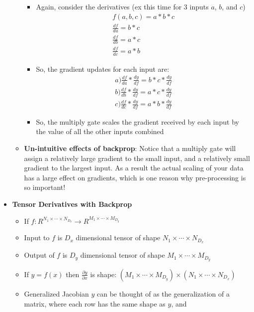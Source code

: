 \documentclass[12pt]{article}
\begin{document}
\begin{itemize}
\begin{itemize}
\begin{itemize}
        \item Again, consider the derivatives (ex this time for 3 inputs $a$, $b$, and $c$)
        \begin{gather*}
          f(a,b,c) = a*b*c \\
          \frac{df}{da} = b*c \\
          \frac{df}{db} = a*c \\
          \frac{df}{dc} = a*b
        \end{gather*}
        \item So, the gradient updates for each input are:
        \begin{gather*}
          a) \frac{df}{da} * \frac{dy}{df} = b*c * \frac{dy}{df} \\
          b) \frac{df}{db} * \frac{dy}{df} = a*c * \frac{dy}{df} \\
          c) \frac{df}{dc} * \frac{dy}{df} = a*b * \frac{dy}{df}
        \end{gather*}
        \item So, the multiply gate scales the gradient received by each input by the value
        of all the other inputs combined
      \end{itemize}
      \item \textbf{Un-intuitive effects of backprop}: Notice that a multiply gate will assign a relatively large gradient to the
      small input, and a relatively small gradient to the largest input. As a result the actual scaling of your data has a large effect
      on gradients, which is one reason why pre-processing is so important!
    \end{itemize}
    \item \textbf{Tensor Derivatives with Backprop}
    \begin{itemize}
      \item If $f: R^{N_1 \times \dotsi \times N_{D_x}} \rightarrow R^{M_1 \times \dotsi \times M_{D_y}}$
      \item Input to $f$ is $D_x$ dimensional tensor of shape $N_1 \times \dotsi \times N_{D_x}$
      \item Output of $f$ is $D_y$ dimensional tensor of shape $M_1 \times \dotsi \times M_{D_y}$
      \item If $y = f(x)$ then $\frac{\partial y}{\partial x}$ is shape: $(M_1 \times \dotsi \times M_{D_y}) \times (N_1 \times \dotsi \times N_{D_x})$
      \item Generalized Jacobian $y$ can be thought of as the generalization of a matrix, where each row has the same shape as $y$, and 

\end{itemize}
\end{itemize}
\end{document}
